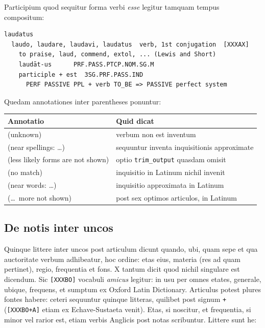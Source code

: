 \documentclass[12pt,
              article,
              oneside
              ]{memoir}
\begin{document}
\noindent{}%
Participium quod sequitur forma verbi \textit{esse} legitur tamquam
tempus compositum:

\begin{verbatim}
laudatus
  laudo, laudare, laudavi, laudatus  verb, 1st conjugation  [XXXAX]
    to praise, laud, commend, extol, ... (Lewis and Short)
    laudāt-us      PRF.PASS.PTCP.NOM.SG.M
    participle + est  3SG.PRF.PASS.IND
      PERF PASSIVE PPL + verb TO_BE => PASSIVE perfect system
\end{verbatim}

\noindent{}%
Quedam annotationes inter parentheses ponuntur:

\begin{longtable}{@{}>{\raggedright}p{}p{}@{}}
\toprule
Annotatio & Quid dicat\\
\midrule
\endhead
(unknown) & verbum non est inventum\\
(near spellings: \ldots) & sequuntur inventa inquisitionis approximate\\
(less likely forms are not shown) & optio \texttt{trim\_output} quasdam omisit\\
(no match) & inquisitio in Latinum nichil invenit\\
(near words: \ldots) & inquisitio approximata in Latinum\\
(\ldots\ more not shown) & post sex optimos articulos, in Latinum\\
\bottomrule
\end{longtable}

\subsection{De notis inter uncos}
\label{sec:codes}

%
Quinque littere inter uncos post articulum dicunt quando, ubi, quam sepe
et qua auctoritate verbum adhibeatur, hoc ordine: etas eius, materia (res
ad quam pertinet), regio, frequentia et fons. X tantum dicit quod nichil
singulare est dicendum. Sic \texttt{[XXXBO]} vocabuli \textit{amicus}
legitur: in usu per omnes etates, generale, ubique, frequens, et sumptum
ex Oxford Latin Dictionary. Articulus potest plures fontes habere: ceteri
sequuntur quinque litteras, quilibet post signum \texttt{+}
(\texttt{[XXXBO+A]} etiam ex Echave-Sustaeta venit). Etas, si noscitur,
et frequentia, si minor vel rarior est, etiam verbis Anglicis post notas
scribuntur. Littere sunt he:
\end{document}
